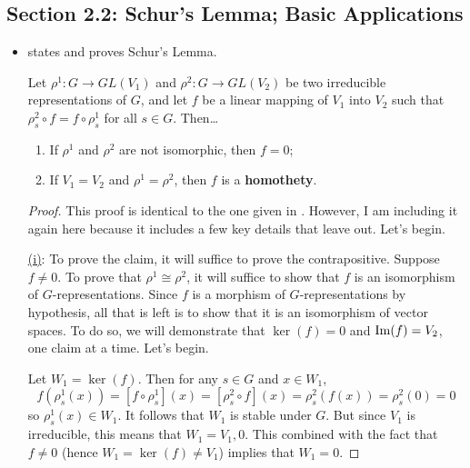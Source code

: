 \documentclass[../notes.tex]{subfiles}
\begin{document}
\subsection*{Section 2.2: Schur's Lemma; Basic Applications}
\begin{itemize}
    \item \textcite{bib:Serre} states and proves Schur's Lemma.
    \begin{proposition}\label{prp:Schur}
        Let $\rho^1:G\to GL(V_1)$ and $\rho^2:G\to GL(V_2)$ be two irreducible representations of $G$, and let $f$ be a linear mapping of $V_1$ into $V_2$ such that $\rho_s^2\circ f=f\circ\rho_s^1$ for all $s\in G$. Then\dots
        \begin{enumerate}[label={\textup{(\roman*)}}]
            \item If $\rho^1$ and $\rho^2$ are not isomorphic, then $f=0$;
            \item If $V_1=V_2$ and $\rho^1=\rho^2$, then $f$ is a \textbf{homothety}.
        \end{enumerate}
        \begin{proof}
            This proof is identical to the one given in \textcite{bib:FultonHarris}. However, I am including it again here because it includes a few key details that \textcite{bib:FultonHarris} leave out. Let's begin.\par\smallskip
            \underline{(i)}:
            To prove the claim, it will suffice to prove the contrapositive. Suppose $f\neq 0$. To prove that $\rho^1\cong\rho^2$, it will suffice to show that $f$ is an isomorphism of $G$-representations. Since $f$ is a morphism of $G$-representations by hypothesis, all that is left is to show that it is an isomorphism of vector spaces. To do so, we will demonstrate that $\ker(f)=0$ and $\operatorname{Im}(f)=V_2$, one claim at a time. Let's begin.\par
            Let $W_1=\ker(f)$. Then for any $s\in G$ and $x\in W_1$,
            \begin{equation*}
                f(\rho_s^1(x)) = [f\circ\rho_s^1](x)
                = [\rho_s^2\circ f](x)
                = \rho_s^2(f(x))
                = \rho_s^2(0)
                = 0
            \end{equation*}
            so $\rho_s^1(x)\in W_1$. It follows that $W_1$ is stable under $G$. But since $V_1$ is irreducible, this means that $W_1=V_1,0$. This combined with the fact that $f\neq 0$ (hence $W_1=\ker(f)\neq V_1$) implies that $W_1=0$.\par

\end{proof}
\end{proposition}
\end{itemize}
\end{document}
